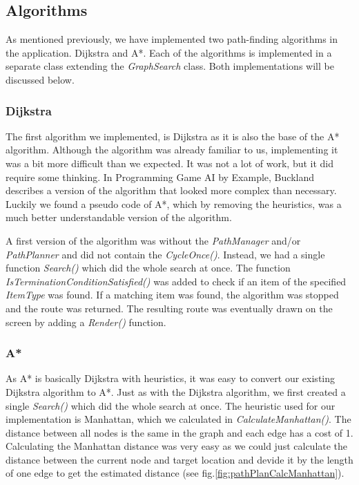 \documentclass[11pt]{article}
\begin{document}
    \subsection{Algorithms}\label{subsec:pathalgorithms}
    As mentioned previously, we have implemented two path-finding algorithms in the application.
    Dijkstra and A*. Each of the algorithms is implemented in a separate class extending the \textit{GraphSearch} class.
    Both implementations will be discussed below.
    
    \subsubsection{Dijkstra}\label{sec:pathDijkstra}
    The first algorithm we implemented, is Dijkstra as it is also the base of the A* algorithm.
    Although the algorithm was already familiar to us, implementing it was a bit more difficult than we expected.
    It was not a lot of work, but it did require some thinking.
    In Programming Game AI by Example, Buckland describes a version of the algorithm that looked more complex than necessary.
    Luckily we found a pseudo code\cite{aapc} of A*, which by removing the heuristics, was a much better understandable version of the algorithm.\par
    
    A first version of the algorithm was without the \textit{PathManager} and/or \textit{PathPlanner} and did not contain the \textit{CycleOnce()}.
    Instead, we had a single function \textit{Search()} which did the whole search at once.
    The function \textit{IsTerminationConditionSatisfied()} was added to check if an item of the specified \textit{ItemType} was found.
    If a matching item was found, the algorithm was stopped and the route was returned.
    The resulting route was eventually drawn on the screen by adding a \textit{Render()} function.
    
    \subsubsection{A*}\label{sec:pathAstar}
    As A* is basically Dijkstra with heuristics, it was easy to convert our existing Dijkstra algorithm to A*.
    Just as with the Dijkstra algorithm, we first created a single \textit{Search()} which did the whole search at once.
    The heuristic used for our implementation is Manhattan, which we calculated in \textit{CalculateManhattan()}.
    The distance between all nodes is the same in the graph and each edge has a cost of 1.
    Calculating the Manhattan distance was very easy as we could just calculate the distance between the current node and target location
    and devide it by the length of one edge to get the estimated distance (see fig.\ref{fig:pathPlanCalcManhattan}).
\end{document}
